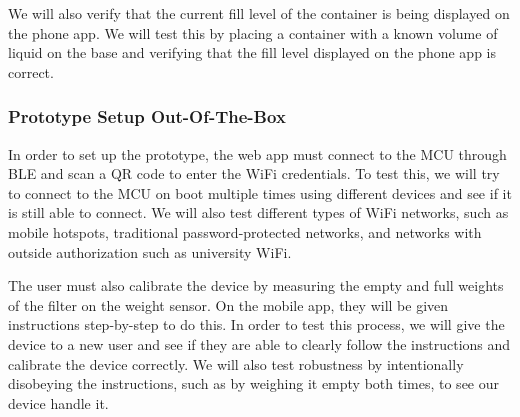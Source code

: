 We will also verify that the current fill level of the container is being displayed on the phone app. We will test this by placing a container with a known volume of liquid on the base and verifying that the fill level displayed on the phone app is correct.

\subsubsection*{Prototype Setup Out-Of-The-Box}

In order to set up the prototype, the web app must connect to the MCU through BLE and scan a QR code to enter the WiFi credentials. To test this, we will try to connect to the MCU on boot multiple times using different devices and see if it is still able to connect. We will also test different types of WiFi networks, such as mobile hotspots, traditional password-protected networks, and networks with outside authorization such as university WiFi.

The user must also calibrate the device by measuring the empty and full weights of the filter on the weight sensor. On the mobile app, they will be given instructions step-by-step to do this. In order to test this process, we will give the device to a new user and see if they are able to clearly follow the instructions and calibrate the device correctly. We will also test robustness by intentionally disobeying the instructions, such as by weighing it empty both times, to see our device handle it.

